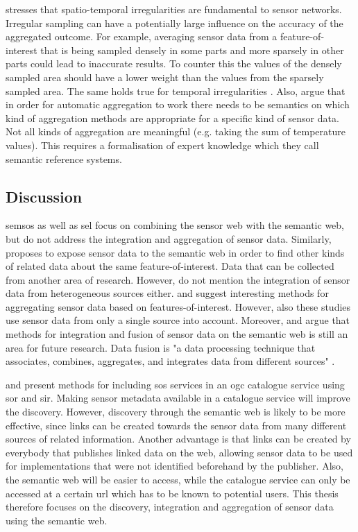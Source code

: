 \cite{SW:Ganesan} stresses that spatio-temporal irregularities are fundamental to sensor networks. Irregular sampling can have a potentially large influence on the accuracy of the aggregated outcome. For example, averaging sensor data from a feature-of-interest that is being sampled densely in some parts and more sparsely in other parts could lead to inaccurate results. To counter this the values of the densely sampled area should have a lower weight than the values from the sparsely sampled area. The same holds true for temporal irregularities \citep{SW:Ganesan}. Also, \cite{SSW:Stasch4} argue that in order for automatic aggregation to work there needs to be semantics on which kind of aggregation methods are appropriate for a specific kind of sensor data. Not all kinds of aggregation are meaningful (e.g. taking the sum of temperature values). This requires a formalisation of expert knowledge which they call semantic reference systems. 

\subsection{Discussion}
\ac{semsos} \citep{SSW:Henson, SSW:Pschorr} as well as \ac{sel} \citep{SSW:Janowicz} focus on combining the sensor web with the semantic web, but do not address the integration and aggregation of sensor data. Similarly, \cite{SSW:Atkinson} proposes to expose sensor data to the semantic web in order to find other kinds of related data about the same feature-of-interest. Data that can be collected from another area of research. However, \cite{SSW:Atkinson} do not mention the integration of sensor data from heterogeneous sources either. \cite{SSW:Stasch} and \cite{SSW:Stasch3} suggest interesting methods for aggregating sensor data based on features-of-interest. However, also these studies use sensor data from only a single source into account. Moreover, \cite{SSW:Corcho} and \cite{SSW:Ji} argue that methods for integration and fusion of sensor data on the semantic web is still an area for future research. Data fusion is "a data processing technique that associates, combines, aggregates, and integrates data from different sources" \cite[p. 2]{SSW:Wang2}. 

\cite{SW:OGC3} and \cite{SW:OGC4} present methods for including \ac{sos} services in an \ac{ogc} catalogue service using \ac{sor} and \ac{sir}. Making sensor metadata available in a catalogue service will improve the discovery. However, discovery through the semantic web is likely to be more effective, since links can be created towards the sensor data from many different sources of related information. Another advantage is that links can be created by everybody that publishes linked data on the web, allowing sensor data to be used for implementations that were not identified beforehand by the publisher. Also, the semantic web will be easier to access, while the catalogue service can only be accessed at a certain \ac{url} which has to be known to potential users. This thesis therefore focuses on the discovery, integration and aggregation of sensor data using the semantic web.

